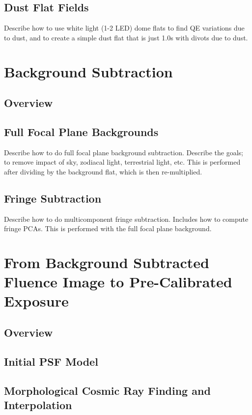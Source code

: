 \subsection{Dust Flat Fields}
Describe how to use white light (1-2 LED) dome flats to find QE variations due to dust, and to create a simple dust flat that is just 1.0s with divots due to dust.

\section{Background Subtraction}

\subsection{Overview}

\subsection{Full Focal Plane Backgrounds}
Describe how to do full focal plane background subtraction. 
Describe the goals;  to remove impact of sky, zodiacal light, terrestrial light, etc.
This is performed after dividing by the background flat, which is then re-multiplied.

\subsection{Fringe Subtraction}
Describe how to do multicomponent fringe subtraction.
Includes how to compute fringe PCAs.
This is performed with the full focal plane background.


\section{From Background Subtracted Fluence Image to Pre-Calibrated Exposure}

\subsection{Overview}

\subsection{Initial PSF Model}

\subsection{Morphological Cosmic Ray Finding and Interpolation}

